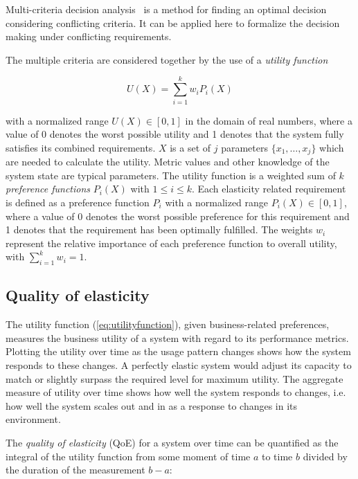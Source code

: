 \documentclass[english]{tktltiki2}
\theoremstyle{definition}
\theoremstyle{remark}
\begin{document}
Multi-criteria decision analysis~\cite{Duboc2007}\cite{Ke2012} is a method
for finding an optimal decision considering conflicting criteria. It can be
applied here to formalize the decision making under conflicting requirements.


The multiple criteria are considered together by the use of a \emph{utility
function}

\begin{equation}
U(X) = \sum\limits_{i=1}^k w_{i}P_{i}(X) \label{eq:utilityfunction}
\end{equation}

with a normalized range $U(X) \in [0, 1]$ in the domain of real numbers, where a
value of 0 denotes the worst possible utility and 1 denotes that the system
fully satisfies its combined requirements. $X$ is a set of $j$ parameters
$\{x_{1}, \dots, x_{j}\}$ which are needed to calculate the utility. Metric
values and other knowledge of the system state are typical parameters. The
utility function is a weighted sum of $k$ \emph{preference functions} $P_{i}(X)$
with $1 \le i \le k$. Each elasticity related requirement is defined as a
preference function $P_{i}$ with a normalized range $P_{i}(X) \in [0, 1]$, where
a value of 0 denotes the worst possible preference for this requirement and 1
denotes that the requirement has been optimally fulfilled. The weights $w_{i}$
represent the relative importance of each preference function to overall
utility, with $\sum_{i=1}^k w_{i} = 1$.


\subsection{Quality of elasticity} The utility function (\ref{eq:utilityfunction}),
given business-related preferences, measures the business utility of a system
with regard to its performance metrics. Plotting the utility over time as the
usage pattern changes shows how the system responds to these changes. A perfectly
elastic system would adjust its capacity to match or slightly surpass the
required level for maximum utility. The aggregate measure of utility over time
shows how well the system responds to changes, i.e. how well the system scales
out and in as a response to changes in its environment.

The \emph{quality of elasticity} (QoE) for a system over time can be quantified
as the integral of the utility function from some moment of time $a$ to time
$b$ divided by the duration of the measurement $b - a$:
\end{document}
